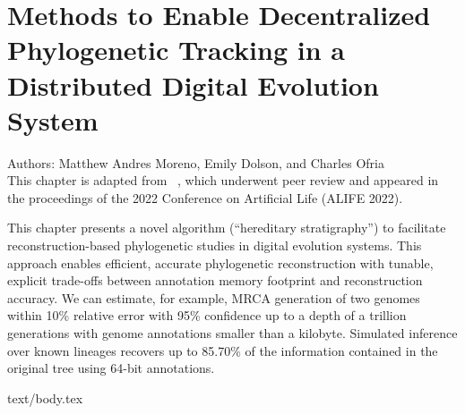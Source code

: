 \chapter{Methods to Enable Decentralized Phylogenetic Tracking in a Distributed Digital Evolution System}
\label{ch:distributed-phylogeny}

\noindent
Authors: Matthew Andres Moreno, Emily Dolson, and Charles Ofria \\
This chapter is adapted from ~\citep{moreno2022hereditary}, which underwent peer review and appeared in the proceedings of the 2022 Conference on Artificial Life (ALIFE 2022).

This chapter presents a novel algorithm (``hereditary stratigraphy'') to facilitate reconstruction-based phylogenetic studies in digital evolution systems.
This approach enables efficient, accurate phylogenetic reconstruction with tunable, explicit trade-offs between annotation memory footprint and reconstruction accuracy.
We can estimate, for example, MRCA generation of two genomes within 10\% relative error with 95\% confidence up to a depth of a trillion generations with genome annotations smaller than a kilobyte.
Simulated inference over known lineages recovers up to 85.70\% of the information contained in the original tree using 64-bit annotations.

{text/body.tex}
